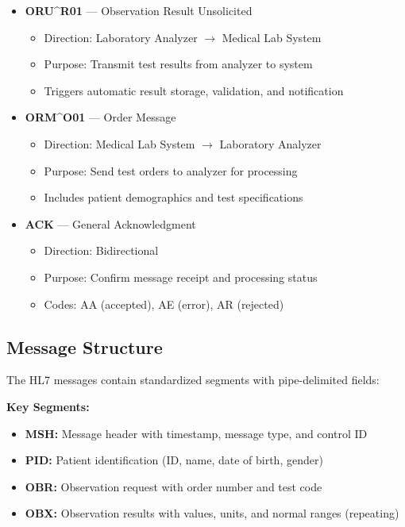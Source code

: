 \documentclass[12pt, a4paper]{report}
\begin{document}
\begin{itemize}
    \item \textbf{ORU\^{}R01} — Observation Result Unsolicited
    \begin{itemize}
        \item Direction: Laboratory Analyzer $\rightarrow$ Medical Lab System
        \item Purpose: Transmit test results from analyzer to system
        \item Triggers automatic result storage, validation, and notification
    \end{itemize}
    
    \item \textbf{ORM\^{}O01} — Order Message
    \begin{itemize}
        \item Direction: Medical Lab System $\rightarrow$ Laboratory Analyzer
        \item Purpose: Send test orders to analyzer for processing
        \item Includes patient demographics and test specifications
    \end{itemize}
    
    \item \textbf{ACK} — General Acknowledgment
    \begin{itemize}
        \item Direction: Bidirectional
        \item Purpose: Confirm message receipt and processing status
        \item Codes: AA (accepted), AE (error), AR (rejected)
    \end{itemize}
\end{itemize}



\subsection{Message Structure}

The HL7 messages contain standardized segments with pipe-delimited fields:

\textbf{Key Segments:}
\begin{itemize}
    \item \textbf{MSH:} Message header with timestamp, message type, and control ID
    \item \textbf{PID:} Patient identification (ID, name, date of birth, gender)
    \item \textbf{OBR:} Observation request with order number and test code
    \item \textbf{OBX:} Observation results with values, units, and normal ranges (repeating)
\end{itemize}
\end{document}
